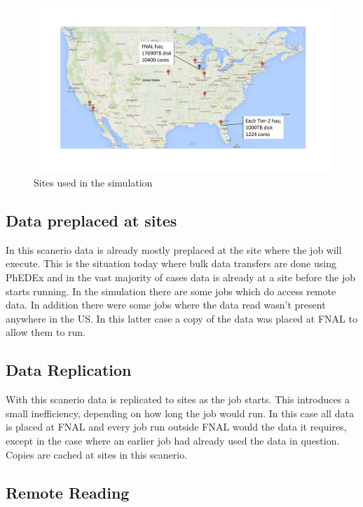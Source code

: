 \documentclass[a4paper]{jpconf}
\begin{document}
\begin{figure}
  \includegraphics[trim=80 90 80 90, clip, width=\textwidth]{figures/map.pdf}
  \caption{Sites used in the simulation\label{fig:map}}
\end{figure}

\subsection{Data preplaced at sites\label{sec:today}}

In this scanerio data is already mostly preplaced at the site where
the job will execute. This is the situation today where bulk data
transfers are done using PhEDEx and in the vast majority of cases data
is already at a site before the job starts running. In the simulation
there are some jobs which do access remote data. In addition there
were some jobs where the data read wasn't present anywhere in the
US. In this latter case a copy of the data was placed at FNAL to allow
them to run.

\subsection{Data Replication}

With this scanerio data is replicated to sites as the job starts. This
introduces a small inefficiency, depending on how long the job would
run. In this case all data is placed at FNAL and every job run outside
FNAL would the data it requires, except in the case where an earlier
job had already used the data in question. Copies are cached at sites
in this scanerio.

\subsection{Remote Reading}
\end{document}
